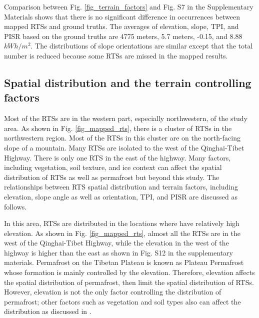 \documentclass[preprint,12pt,authoryear]{elsarticle}
\begin{document}
Comparison between Fig. \ref{fig_terrain_factors} and Fig. S7 in the Supplementary Materials shows that there is no significant difference in occurrences between mapped RTSs and ground truths. The averages of elevation, slope, TPI, and PISR based on the ground truths are 4775 meters, 5.7 meters, -0.15, and 8.88 $kWh/m^2$. The distributions of slope orientations are similar except that the total number is reduced because some RTSs are missed in the mapped results. 

\subsection{Spatial distribution and the terrain controlling factors}
\label{subsec_rts_spatial}

Most of the RTSs are in the western part, especially northwestern, of the study area. As shown in Fig. \ref{fig_mapped_rts}, there is a cluster of RTSs in the northwestern region. Most of the RTSs in this cluster are on the north-facing slope of a mountain. Many RTSs are isolated to the west of the Qinghai-Tibet Highway. There is only one RTS in the east of the highway. Many factors, including vegetation, soil texture, and ice context can affect the spatial distribution of RTSs as well as permafrost but beyond this study. The relationships between RTS spatial distribution and terrain factors, including elevation, slope angle as well as orientation, TPI, and PISR are discussed as follows.





In this area, RTSs are distributed in the locations where have relatively high elevation.
As shown in Fig. \ref{fig_mapped_rts}, almost all the RTSs are in the west of the Qinghai-Tibet Highway, while the elevation in the west of the highway is higher than the east as shown in Fig. S12 in the supplementary materials. Permafrost on the Tibetan Plateau is known as Plateau Permafrost whose formation is mainly controlled by the elevation. Therefore, elevation affects the spatial distribution of permafrost, then limit the spatial distribution of RTSs. However, elevation is not the only factor controlling the distribution of permafrost; other factors such as vegetation and soil types also can affect the distribution as discussed in \cite{yin2017effects}.
\end{document}
